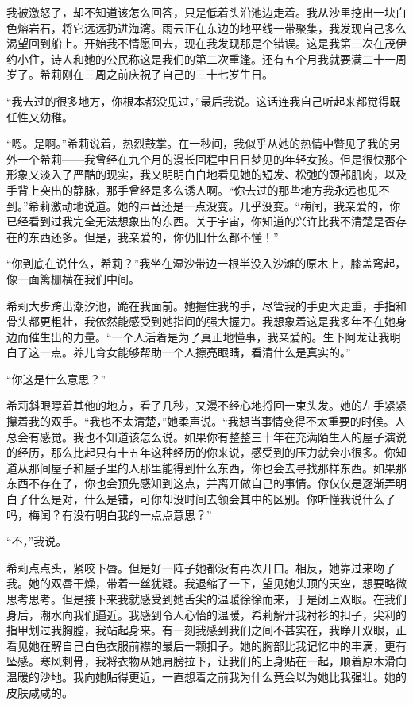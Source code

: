 \documentclass[AutoFakeBold=true]{book}
\begin{document}
我被激怒了，却不知道该怎么回答，只是低着头沿池边走着。我从沙里挖出一块白色熔岩石，将它远远扔进海湾。雨云正在东边的地平线一带聚集，我发现自己多么渴望回到船上。开始我不情愿回去，现在我发现那是个错误。这是我第三次在茂伊约小住，诗人和她的公民称这是我们的第二次重逢。还有五个月我就要满二十一周岁了。希莉刚在三周之前庆祝了自己的三十七岁生日。

``我去过的很多地方，你根本都没见过，''最后我说。这话连我自己听起来都觉得既任性又幼稚。

``嗯。是啊。''希莉说着，热烈鼓掌。在一秒间，我似乎从她的热情中瞥见了我的另外一个希莉——我曾经在九个月的漫长回程中日日梦见的年轻女孩。但是很快那个形象又淡入了严酷的现实，我又明明白白地看见她的短发、松弛的颈部肌肉，以及手背上突出的静脉，那手曾经是多么诱人啊。``你去过的那些地方我永远也见不到。''希莉激动地说道。她的声音还是一点没变。几乎没变。``梅闰，我亲爱的，你已经看到过我完全无法想象出的东西。关于宇宙，你知道的兴许比我不清楚是否存在的东西还多。但是，我亲爱的，你仍旧什么都不懂！''

``你到底在说什么，希莉？''我坐在湿沙带边一根半没入沙滩的原木上，膝盖弯起，像一面篱栅横在我们中间。

希莉大步跨出潮汐池，跪在我面前。她握住我的手，尽管我的手更大更重，手指和骨头都更粗壮，我依然能感受到她指间的强大握力。我想象着这是我多年不在她身边而催生出的力量。``一个人活着是为了真正地懂事，我亲爱的。生下阿龙让我明白了这一点。养儿育女能够帮助一个人擦亮眼睛，看清什么是真实的。''

``你这是什么意思？''

希莉斜眼瞟着其他的地方，看了几秒，又漫不经心地捋回一束头发。她的左手紧紧攥着我的双手。``我也不太清楚，''她柔声说。``我想当事情变得不太重要的时候。人总会有感觉。我也不知道该怎么说。如果你有整整三十年在充满陌生人的屋子演说的经历，那么比起只有十五年这种经历的你来说，感受到的压力就会小很多。你知道从那间屋子和屋子里的人那里能得到什么东西，你也会去寻找那样东西。如果那东西不存在了，你也会预先感知到这点，并离开做自己的事情。你仅仅是逐渐弄明白了什么是对，什么是错，可你却没时间去领会其中的区别。你听懂我说什么了吗，梅闰？有没有明白我的一点点意思？''

``不，''我说。

希莉点点头，紧咬下唇。但是好一阵子她都没有再次开口。相反，她靠过来吻了我。她的双唇干燥，带着一丝犹疑。我退缩了一下，望见她头顶的天空，想要略微思考思考。但是接下来我就感受到她舌尖的温暖徐徐而来，于是闭上双眼。在我们身后，潮水向我们逼近。我感到令人心怡的温暖，希莉解开我衬衫的扣子，尖利的指甲划过我胸膛，我站起身来。有一刻我感到我们之间不甚实在，我睁开双眼，正看见她在解自己白色衣服前襟的最后一颗扣子。她的胸部比我记忆中的丰满，更有坠感。寒风刺骨，我将衣物从她肩膀拉下，让我们的上身贴在一起，顺着原木滑向温暖的沙地。我向她贴得更近，一直想着之前我为什么竟会以为她比我强壮。她的皮肤咸咸的。
\end{document}
